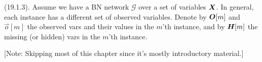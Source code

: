 \documentclass[11pt]{article}
\begin{document}
\myspace \p {} (19.1.3). Assume we have a BN network $\mathcal G$ over a set of variables $\bm{X}_{}$. In general, each instance has a different set of observed variables. Denote by $\bm{O}_{}[m]$ and $\vec{o}[m]$ the observed vars and their values in the $m$'th instance, and by $\bm{H}_{}[m]$ the missing (or hidden) vars in the $m$'th instance. 










\renewcommand{\Z}{\mathbb{Z}}
\label{Information Theory, Inference, and Learning Algorithms}



{\footnotesize [Note: Skipping most of this chapter since it's mostly introductory material.]}
\end{document}
